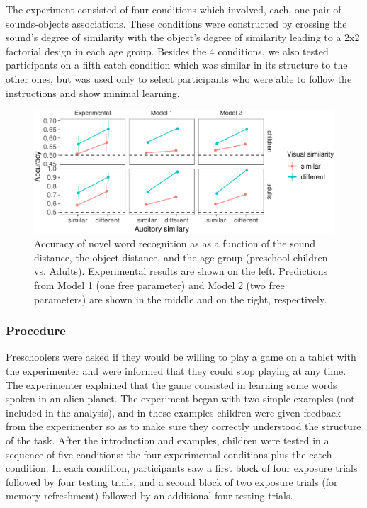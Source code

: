 \documentclass[10pt, letterpaper]{article}
\newenvironment{CodeChunk}{}{}
\begin{document}
The experiment consisted of four conditions which involved, each, one
pair of sounds-objects associations. These conditions were constructed
by crossing the sound's degree of similarity with the object's degree of
similarity leading to a 2x2 factorial design in each age group. Besides
the 4 conditions, we also tested participants on a fifth catch condition
which was similar in its structure to the other ones, but was used only
to select participants who were able to follow the instructions and show
minimal learning.

\begin{CodeChunk}
\begin{figure}[h]

{\centering \includegraphics{figs/all_data-1} 

}

\caption{\label{fig:data_all}Accuracy of novel word recognition as as a function of the sound distance, the object distance, and the age group (preschool children vs. Adults). Experimental results are shown on the left. Predictions from Model 1 (one free parameter) and Model 2 (two free parameters) are shown in the middle and on the right, respectively.}\label{fig:all_data}
\end{figure}
\end{CodeChunk}

\subsubsection{Procedure}\label{procedure}

Preschoolers were asked if they would be willing to play a game on a
tablet with the experimenter and were informed that they could stop
playing at any time. The experimenter explained that the game consisted
in learning some words spoken in an alien planet. The experiment began
with two simple examples (not included in the analysis), and in these
examples children were given feedback from the experimenter so as to
make sure they correctly understood the structure of the task. After the
introduction and examples, children were tested in a sequence of five
conditions: the four experimental conditions plus the catch condition.
In each condition, participants saw a first block of four exposure
trials followed by four testing trials, and a second block of two
exposure trials (for memory refreshment) followed by an additional four
testing trials.
\end{document}
